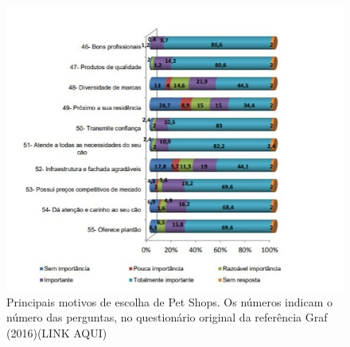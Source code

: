 \begin{figure}
    \centering
    \includegraphics{exemplos/diagramas/graf_analise.jpeg}
    \caption{Principais motivos de escolha de Pet Shops. Os números indicam o número das perguntas, no questionário original da referência Graf (2016)(LINK AQUI)}
    \label{fig:graf_analise}
\end{figure}
\\

